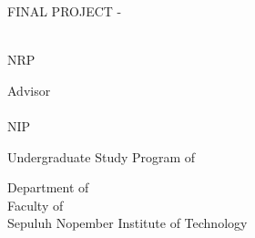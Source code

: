 \begin{large}
  FINAL PROJECT - \coursecode{}
\end{large}

\vspace{\fill}

\begin{spacing}{1.5}
  \begin{Large}
    \engtatitle{}
  \end{Large}
\end{spacing}

\vspace{\fill}

\begin{large}
  \name{} \\
  \textmd{NRP \nrp{}}
\end{large}

\vspace{\fill}

\begin{large}
  \textmd{Advisor} \\
  \advisor{} \\
  \textmd{NIP \advisornip{}} \\
  
\end{large}

\vspace{\fill}

Undergraduate Study Program of \engstudyprogram{} \\

\mdseries

Department of \engdepartment{} \\
Faculty of \engfaculty{} \\
Sepuluh Nopember Institute of Technology

\place{} \\ \the\year{}

